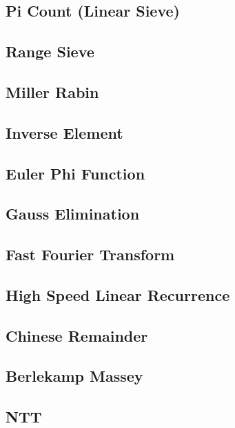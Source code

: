 \documentclass[a4paper,10pt,twocolumn,oneside]{article}
\begin{document}
\subsection{Pi Count (Linear Sieve)}

\subsection{Range Sieve}

\subsection{Miller Rabin}

\subsection{Inverse Element}

\subsection{Euler Phi Function}

\subsection{Gauss Elimination}

\subsection{Fast Fourier Transform}

\subsection{High Speed Linear Recurrence}

\subsection{Chinese Remainder}

\subsection{Berlekamp Massey}

\subsection{NTT}

\end{document}
